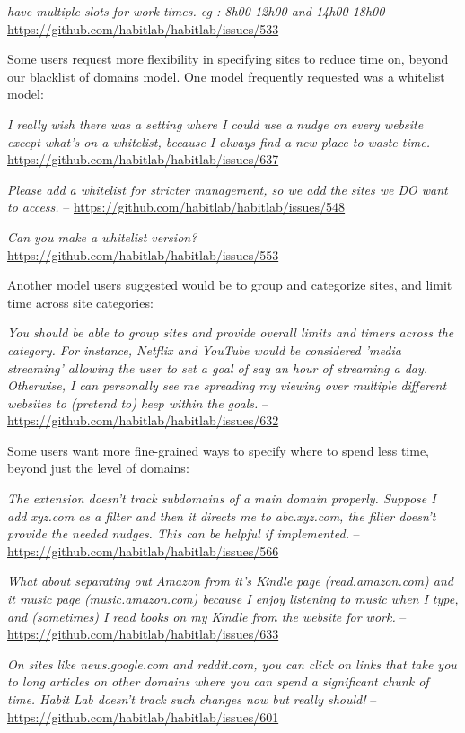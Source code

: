 \textit{have multiple slots for work times. eg : 8h00 12h00 and 14h00 18h00} -- \url{https://github.com/habitlab/habitlab/issues/533}

Some users request more flexibility in specifying sites to reduce time on, beyond our blacklist of domains model. One model frequently requested was a whitelist model:

\textit{I really wish there was a setting where I could use a nudge on every website except what's on a whitelist, because I always find a new place to waste time.} -- \url{https://github.com/habitlab/habitlab/issues/637}

\textit{Please add a whitelist for stricter management, so we add the sites we DO want to access.} -- \url{https://github.com/habitlab/habitlab/issues/548}

\textit{Can you make a whitelist version?} \url{https://github.com/habitlab/habitlab/issues/553}

Another model users suggested would be to group and categorize sites, and limit time across site categories:

\textit{You should be able to group sites and provide overall limits and timers across the category. For instance, Netflix and YouTube would be considered 'media streaming' allowing the user to set a goal of say an hour of streaming a day. Otherwise, I can personally see me spreading my viewing over multiple different websites to (pretend to) keep within the goals.} -- \url{https://github.com/habitlab/habitlab/issues/632}

Some users want more fine-grained ways to specify where to spend less time, beyond just the level of domains:

\textit{The extension doesn't track subdomains of a main domain properly. Suppose I add xyz.com as a filter and then it directs me to abc.xyz.com, the filter doesn't provide the needed nudges. This can be helpful if implemented.} -- \url{https://github.com/habitlab/habitlab/issues/566}

\textit{What about separating out Amazon from it's Kindle page (read.amazon.com) and it music page (music.amazon.com) because I enjoy listening to music when I type, and (sometimes) I read books on my Kindle from the website for work.} -- \url{https://github.com/habitlab/habitlab/issues/633}

\textit{On sites like news.google.com and reddit.com, you can click on links that take you to long articles on other domains where you can spend a significant chunk of time. Habit Lab doesn't track such changes now but really should!} -- \url{https://github.com/habitlab/habitlab/issues/601}

